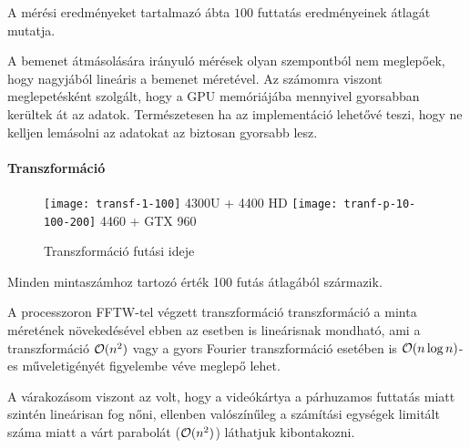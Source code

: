 A m\'er\'esi eredm\'enyeket tartalmaz\'o \'abta $100$ futtat\'as eredm\'enyeinek \'atlag\'at mutatja.

A bemenet \'atm\'asol\'as\'ara ir\'anyul\'o m\'er\'esek olyan szempontb\'ol nem meglep\H oek, hogy nagyj\'ab\'ol line\'aris a bemenet m\'eret\'evel. Az sz\'amomra viszont meglepet\'esk\'ent szolg\'alt, hogy a GPU mem\'ori\'aj\'aba mennyivel gyorsabban ker\"ultek \'at az adatok. Term\'eszetesen ha az implement\'aci\'o lehet\H ov\'e teszi, hogy ne kelljen lem\'asolni az adatokat az biztosan gyorsabb lesz.

\paragraph{Transzform\'aci\'o}

\begin{figure}[h]
	\texttt{[image: transf-1-100]}
	{4300U + 4400 HD}
	\texttt{[image: tranf-p-10-100-200]}
	{4460 + GTX 960}
	\centering
	\caption{Transzform\'aci\'o fut\'asi ideje}
\end{figure}

Minden mintasz\'amhoz tartoz\'o \'ert\'ek 100 fut\'as \'atlag\'ab\'ol sz\'armazik.

A processzoron FFTW-tel v\'egzett transzform\'aci\'o transzform\'aci\'o a minta m\'eret\'enek n\"oveked\'es\'evel ebben az esetben is line\'arisnak mondhat\'o, ami a transzform\'aci\'o $\mathcal{O}(n^2)$ vagy a gyors Fourier transzform\'aci\'o eset\'eben is $\mathcal{O}(n\log{n})$-es m\H uveletig\'eny\'et figyelembe v\'eve meglep\H o lehet.

A v\'arakoz\'asom viszont az volt, hogy a vide\'ok\'artya a p\'arhuzamos futtat\'as miatt szint\'en line\'arisan fog n\H oni, ellenben val\'osz\'in\H uleg a sz\'am\'it\'asi egys\'egek limit\'alt sz\'ama miatt a v\'art parabol\'at ($\mathcal{O}(n^2)$) l\'athatjuk kibontakozni.
